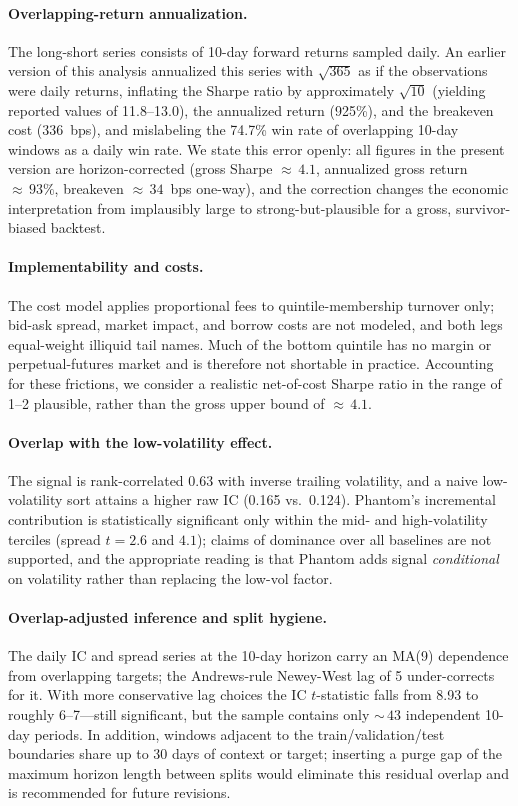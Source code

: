 \documentclass[sigconf]{acmart}
\begin{document}
\paragraph{Overlapping-return annualization.}
The long-short series consists of 10-day forward returns sampled daily.
An earlier version of this analysis annualized this series with $\sqrt{365}$ as if the observations were daily returns, inflating the Sharpe ratio by approximately $\sqrt{10}$ (yielding reported values of 11.8--13.0), the annualized return (925\%), and the breakeven cost (336~bps), and mislabeling the 74.7\% win rate of overlapping 10-day windows as a daily win rate.
We state this error openly: all figures in the present version are horizon-corrected (gross Sharpe ${\approx}\,4.1$, annualized gross return ${\approx}\,93\%$, breakeven ${\approx}\,34$~bps one-way), and the correction changes the economic interpretation from implausibly large to strong-but-plausible for a gross, survivor-biased backtest.

\paragraph{Implementability and costs.}
The cost model applies proportional fees to quintile-membership turnover only; bid-ask spread, market impact, and borrow costs are not modeled, and both legs equal-weight illiquid tail names.
Much of the bottom quintile has no margin or perpetual-futures market and is therefore not shortable in practice.
Accounting for these frictions, we consider a realistic net-of-cost Sharpe ratio in the range of 1--2 plausible, rather than the gross upper bound of ${\approx}\,4.1$.

\paragraph{Overlap with the low-volatility effect.}
The signal is rank-correlated 0.63 with inverse trailing volatility, and a naive low-volatility sort attains a higher raw IC (0.165 vs.\ 0.124).
Phantom's incremental contribution is statistically significant only within the mid- and high-volatility terciles (spread $t = 2.6$ and $4.1$); claims of dominance over all baselines are not supported, and the appropriate reading is that Phantom adds signal \emph{conditional} on volatility rather than replacing the low-vol factor.

\paragraph{Overlap-adjusted inference and split hygiene.}
The daily IC and spread series at the 10-day horizon carry an MA(9) dependence from overlapping targets; the Andrews-rule Newey-West lag of 5 under-corrects for it.
With more conservative lag choices the IC $t$-statistic falls from 8.93 to roughly 6--7---still significant, but the sample contains only ${\sim}\,43$ independent 10-day periods.
In addition, windows adjacent to the train/validation/test boundaries share up to 30 days of context or target; inserting a purge gap of the maximum horizon length between splits would eliminate this residual overlap and is recommended for future revisions.
\end{document}
